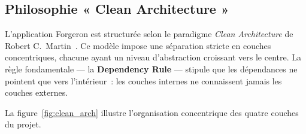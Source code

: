 \documentclass[12pt,a4paper]{report}
\begin{document}
\subsection{Philosophie « Clean Architecture »}

L'application Forgeron est structurée selon le paradigme \textit{Clean Architecture} de Robert C.~Martin~\cite{martin2017clean}. Ce modèle impose une séparation stricte en couches concentriques, chacune ayant un niveau d'abstraction croissant vers le centre. La règle fondamentale --- la \textbf{Dependency Rule} --- stipule que les dépendances ne pointent que vers l'intérieur~: les couches internes ne connaissent jamais les couches externes.

La figure~\ref{fig:clean_arch} illustre l'organisation concentrique des quatre couches du projet.
\end{document}
